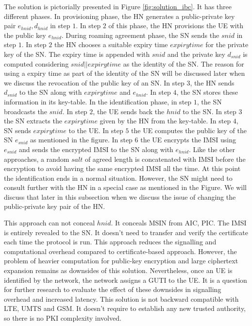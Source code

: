 \documentclass[lnicst,sechang,a4paper]{svmultln}
\begin{document}
The solution is pictorially presented in Figure \ref{fig:solution_ibc}. It has three different phases. In provisioning phase, the HN generates a public-private key pair $e_{hnid},d_{hnid}$ in step $1$. In step $2$ of this phase, the HN provisions the UE with the public key $e_{hnid}$. During roaming agreement phase, the SN sends the $snid$ in step $1$. In step $2$ the HN chooses a suitable expiry time $expirytime$ for the private key of the SN. The expiry time is appended with $snid$ and the private key $d_{snid}$ is computed considering $snid||expirytime$ as the identity of the SN. The reason for using a expiry time as part of the identity of the SN will be discussed later when we discuss the revocation of the public key of an SN. In step $3$, the HN sends $d_{snid}$ to the SN along with $expirytime$ and $e_{hnid}$. In step $4$, the SN stores these information in its key-table. In the identification phase, in step $1$, the SN broadcasts the $snid$. In step $2$, the UE sends back the $hnid$ to the SN. In step $3$ the SN extracts the $expirytime$ given by the HN from the key-table. In step $4$, SN sends $expirytime$ to the UE. In step $5$ the UE computes the public key of the SN $e_{snid}$ as mentioned in the figure. In step $6$ the UE encrypts the IMSI using $e_{snid}$ and sends the encrypted IMSI to the SN along with $e_{hnid}$. Like the other approaches, a random $salt$ of agreed length is concatenated with IMSI before the encryption to avoid having the same encrypted IMSI all the time. At this point the identification ends in a normal situation. However, the SN might need to consult further with the HN in a special case as mentioned in the Figure. We will discuss that later in this subsection when we discuss the issue of changing the public-private key pair of the HN. 


This approach can not conceal $hnid$. It conceals MSIN from AIC, PIC. The IMSI is entirely revealed to the SN. It doesn't need to transfer and verify the certificate each time the protocol is run. This approach reduces the signalling and computational overhead compared to certificate-based approach. However, the problem of heavier computation for public-key encryption and large ciphertext expansion remains as downsides of this solution.  Nevertheless, once an UE is identified by the network, the network assigns a GUTI to the UE. It is a question for further research to evaluate the effect of these downsides in signalling overhead and increased latency. This solution is not backward compatible with LTE, UMTS and GSM. It doesn't require to establish any new trusted authority, so there is no PKI complexity involved.
\end{document}
